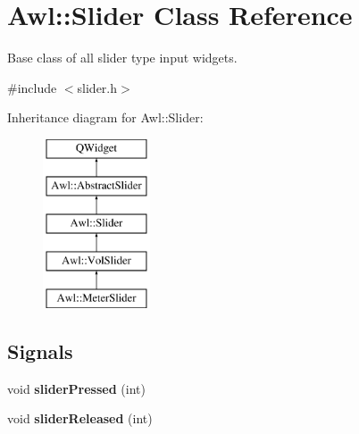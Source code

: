 \hypertarget{class_awl_1_1_slider}{}\section{Awl\+:\+:Slider Class Reference}
\label{class_awl_1_1_slider}


Base class of all slider type input widgets.  




{\ttfamily \#include $<$slider.\+h$>$}

Inheritance diagram for Awl\+:\+:Slider\+:\begin{figure}[H]
\begin{center}
\leavevmode
\includegraphics[height=5.000000cm]{class_awl_1_1_slider}
\end{center}
\end{figure}
\subsection*{Signals}
\begin{DoxyCompactItemize}
\item 
\mbox{\label{class_awl_1_1_slider_abd4d00f9cdbc79fbfb3923c1be6b58e4}} 
void {\bfseries slider\+Pressed} (int)
\item 
\mbox{\label{class_awl_1_1_slider_abdd4ffe90e647a586ea6aef0b523a380}} 
void {\bfseries slider\+Released} (int)
\end{DoxyCompactItemize}
